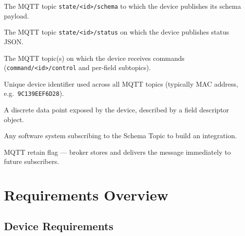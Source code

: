 \documentclass[11pt,a4paper]{article}
\newcommand{\topic}[1]{\texttt{\color{accent}#1}}
\begin{document}
\begin{description}[leftmargin=3.5cm, style=sameline, font=\normalfont\ttfamily]
  \item[Schema Topic]   The MQTT topic \topic{state/\textless id\textgreater/schema} to which the device publishes its schema payload.
  \item[Status Topic]   The MQTT topic \topic{state/\textless id\textgreater/status} on which the device publishes status JSON.
  \item[Command Topic]  The MQTT topic(s) on which the device receives commands (\topic{command/\textless id\textgreater/control} and per-field subtopics).
  \item[Device ID]      Unique device identifier used across all MQTT topics (typically MAC address, e.g.\ \texttt{9C139EEF6D28}).
  \item[Field]          A discrete data point exposed by the device, described by a field descriptor object.
  \item[Consumer]       Any software system subscribing to the Schema Topic to build an integration.
  \item[Retained]       MQTT retain flag — broker stores and delivers the message immediately to future subscribers.
\end{description}

\section{Requirements Overview}

\subsection{Device Requirements}
\end{document}
